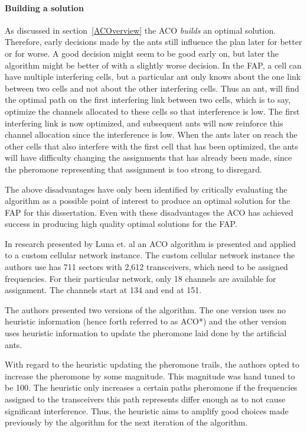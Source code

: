 \paragraph{Building a solution}
As discussed in section~\ref{ACOverview} the ACO \emph{builds} an optimal solution. Therefore, early decisions made by the ants still influence the plan later for better or for worse. A good decision might seem to be good early on, but later the algorithm might be better of with a slightly worse decision. In the FAP, a cell can have multiple interfering cells, but a particular ant only knows about the one link between two cells and not about the other interfering cells. Thus an ant, will find the optimal path on the first interfering link between two cells, which is to say, optimize the channels allocated to these cells so that interference is low. The first interfering link is now optimized, and subsequent ants will now reinforce this channel allocation since the interference is low. When the ants later on reach the other cells that also interfere with the first cell that has been optimized, the ants will have difficulty changing the assignments that has already been made, since the pheromone representing that assignment is too strong to disregard.

The above disadvantages have only been identified by critically evaluating the algorithm as a possible point of interest to produce an optimal solution for the FAP for this dissertation. Even with these disadvantages the ACO has achieved success in producing high quality optimal solutions for the FAP.

In research presented by Luna et. al\cite{ACOvsEA} an ACO algorithm is presented and applied to a custom cellular network instance. The custom cellular network instance the authors use has 711 sectors with 2,612 transceivers, which need to be assigned frequencies. For their particular network, only 18 channels are available for assignment. The channels start at 134 and end at 151\cite{ACOvsEA}.

The authors presented two versions of the algorithm. The one version uses no heuristic information (hence forth referred to as ACO*) and the other version uses heuristic information to update the pheromone laid done by the artificial ants\cite{ACOvsEA}.

With regard to the heuristic updating the pheromone trails, the authors opted to increase the pheromone by some magnitude\cite{ACOvsEA}. This magnitude was hand tuned to be 100. The heuristic only increases a certain paths pheromone if the frequencies assigned to the transceivers this path represents differ enough as to not cause significant interference\cite{ACOvsEA}. Thus, the heuristic aims to amplify good choices made previously by the algorithm for the next iteration of the algorithm.

